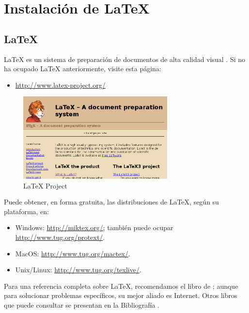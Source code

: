 
\chapter{Instalación de \LaTeX}


\section{\LaTeX}

\LaTeX{} es un sistema de preparación de documentos de alta calidad
visual \citep{latex:whatis}. Si no ha ocupado \LaTeX{} anteriormente,
visite esta página:
\begin{itemize}
\item \href{http://www.latex-project.org/}{http://www.latex-project.org/}
\end{itemize}
\begin{figure}[H]
\begin{centering}
\includegraphics[width=0.7\textwidth]{figures/fig_latex_project_org}
\par\end{centering}

\caption{LaTeX Project}
\end{figure}


Puede obtener, en forma gratuita, las distribuciones de \LaTeX{},
según su plataforma, en:
\begin{itemize}
\item Windows: \href{http://miktex.org/}{http://miktex.org/}; también puede
ocupar \href{http://www.tug.org/protext/}{http://www.tug.org/protext/}.
\item MacOS: \href{http://www.tug.org/mactex/}{http://www.tug.org/mactex/}.
\item Unix/Linux: \href{http://www.tug.org/texlive/}{http://www.tug.org/texlive/}.
\end{itemize}

Para una referencia completa sobre \LaTeX{}, recomendamos el libro
de \citealp{Lamport94}; aunque para solucionar problemas específicos,
su mejor aliado es Internet. Otros libros que puede consultar se presentan
en la Bibliografía \citep{Mittelbach04,Oetiker06,Roberts05}.



